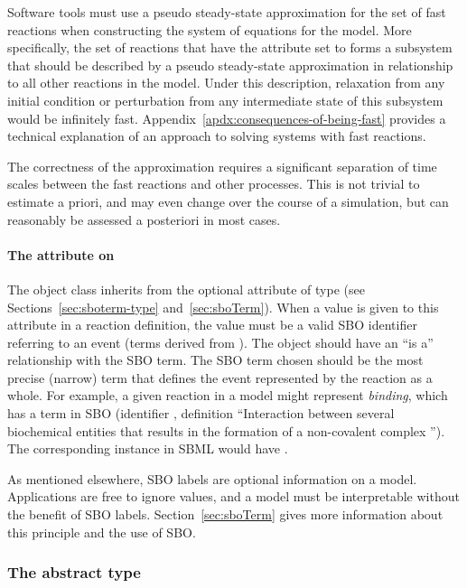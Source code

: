 Software tools must use a pseudo steady-state approximation for
the set of fast reactions when constructing the system of
equations for the model.  More specifically, the set of reactions
that have the  attribute set to  forms a
subsystem that should be described by a pseudo steady-state
approximation in relationship to all other reactions in the model.
Under this description, relaxation from any initial condition or
perturbation from any intermediate state of this subsystem would
be infinitely fast.
Appendix~\ref{apdx:consequences-of-being-fast} provides a
technical explanation of an approach to solving systems with fast
reactions.

The correctness of the approximation requires a significant
separation of time scales between the fast reactions and other
processes.  This is not trivial to estimate a priori, and may even
change over the course of a simulation, but can reasonably be
assessed a posteriori in most cases.


\paragraph{The  attribute on }
\label{sec:reaction-sboterm}

The \Reaction object class inherits from \SBase the optional
 attribute of type 
(see Sections~\ref{sec:sboterm-type} and~\ref{sec:sboTerm}).  When
a value is given to this attribute in a reaction
definition, the value must be a valid SBO identifier referring to
an event (\ie terms derived from \sboevent).  The \Reaction
object should have an ``is a'' relationship with the SBO term.
The SBO term chosen should be the most precise (narrow) term that
defines the event represented by the reaction as a whole.  For
example, a given reaction in a model might represent
\emph{binding}, which has a term in SBO (identifier
, definition ``Interaction between several
biochemical entities that results in the formation of a
non-covalent complex '').  The corresponding \Reaction instance in
SBML would have .

As mentioned elsewhere, SBO labels are optional
information on a model.  Applications are free to ignore
 values, and a model must be interpretable without
the benefit of SBO labels.  Section~\ref{sec:sboTerm} gives more
information about this principle and the use of SBO.


\subsubsection{The  abstract type}
\label{subsec:simplespeciesreference}

